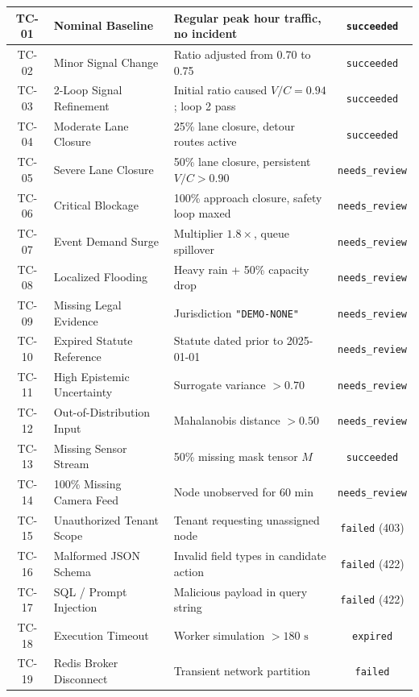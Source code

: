 \begin{longtable}{|c|p{4.2cm}|p{4.8cm}|c|}
TC-01 & Nominal Baseline & Regular peak hour traffic, no incident & \texttt{succeeded} \\
\hline
TC-02 & Minor Signal Change & Ratio adjusted from 0.70 to 0.75 & \texttt{succeeded} \\
\hline
TC-03 & 2-Loop Signal Refinement & Initial ratio caused $V/C=0.94$; loop 2 pass & \texttt{succeeded} \\
\hline
TC-04 & Moderate Lane Closure & 25\% lane closure, detour routes active & \texttt{succeeded} \\
\hline
TC-05 & Severe Lane Closure & 50\% lane closure, persistent $V/C > 0.90$ & \texttt{needs\_review} \\
\hline
TC-06 & Critical Blockage & 100\% approach closure, safety loop maxed & \texttt{needs\_review} \\
\hline
TC-07 & Event Demand Surge & Multiplier $1.8\times$, queue spillover & \texttt{needs\_review} \\
\hline
TC-08 & Localized Flooding & Heavy rain + 50\% capacity drop & \texttt{needs\_review} \\
\hline
TC-09 & Missing Legal Evidence & Jurisdiction \texttt{"DEMO-NONE"} & \texttt{needs\_review} \\
\hline
TC-10 & Expired Statute Reference & Statute dated prior to 2025-01-01 & \texttt{needs\_review} \\
\hline
TC-11 & High Epistemic Uncertainty & Surrogate variance $> 0.70$ & \texttt{needs\_review} \\
\hline
TC-12 & Out-of-Distribution Input & Mahalanobis distance $> 0.50$ & \texttt{needs\_review} \\
\hline
TC-13 & Missing Sensor Stream & 50\% missing mask tensor $M$ & \texttt{succeeded} \\
\hline
TC-14 & 100\% Missing Camera Feed & Node unobserved for 60 min & \texttt{needs\_review} \\
\hline
TC-15 & Unauthorized Tenant Scope & Tenant requesting unassigned node & \texttt{failed} (403) \\
\hline
TC-16 & Malformed JSON Schema & Invalid field types in candidate action & \texttt{failed} (422) \\
\hline
TC-17 & SQL / Prompt Injection & Malicious payload in query string & \texttt{failed} (422) \\
\hline
TC-18 & Execution Timeout & Worker simulation $> 180\text{ s}$ & \texttt{expired} \\
\hline
TC-19 & Redis Broker Disconnect & Transient network partition & \texttt{failed} \\

\end{longtable}
